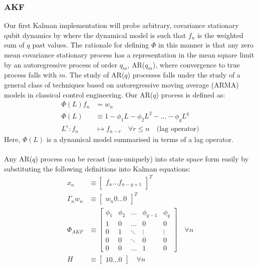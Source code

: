 \subsubsection{AKF}
Our first Kalman implementation will probe arbitrary, covariance stationary qubit dynamics by  where the dynamical model  is such that $f_n$ is the weighted sum of $q$ past values. The rationale for defining $\Phi$ in this manner is that any zero mean covariance stationary process has a representation in the mean square limit by an autoregressive process of order $q_m$, AR($q_m$), where convergence to true process falls with $m$. The study of AR($q$) processes falls under the study of a general class of techniques based on autoregressive moving average (ARMA) models in classical control engineering. Our AR($q$) process is defined as:
\begin{align}
\Phi(L) f_n & = w_n \\
\Phi(L) & \equiv  1 - \phi_1 L - \phi_2 L^2 - ... - \phi_q L^q \\
L^r: f_n &\mapsto f_{n-r} \quad \forall r \leq n \quad \text{(lag operator)} 
\end{align}
Here, $\Phi(L)$ is a dynamical model summarised in terms of a lag operator. 
\\
\\
Any AR($q$) process can be recast (non-uniquely) into state space form easily by substituting the following definitions into Kalman equations:
\begin{align}
x_n & \equiv  \begin{bmatrix} f_{n} \hdots f_{n-q+1} \end{bmatrix}^T \\
\Gamma_n w_n & \equiv \begin{bmatrix} w_{n} 0 \hdots 0 \end{bmatrix}^T \\
\Phi_{AKF} & \equiv 
\begin{bmatrix}
\phi_1 & \phi_2 & \hdots & \phi_{q-1} & \phi_q \\ 
1 & 0 & \hdots & 0 & 0 \\  
0 & 1 & \ddots & \vdots & \vdots \\ 
0 & 0 & \ddots & 0 & 0 \\ 
0 & 0 & \hdots & 1 & 0 
\end{bmatrix} \quad \forall n \label{eqn:akf_Phi} \\
H & \equiv \begin{bmatrix} 1 0 \hdots 0 \end{bmatrix} \quad \forall n 
\end{align}
